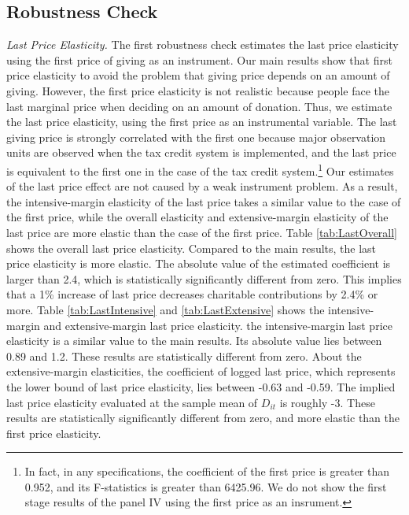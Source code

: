 \documentclass[
  11pt,
  a4paper,
]{article}
\begin{document}
\hypertarget{robustness-check}{%
\subsection{Robustness Check}\label{robustness-check}}

\emph{Last Price Elasticity.}
The first robustness check estimates the last price elasticity using the first price of giving as an instrument.
Our main results show that first price elasticity to avoid the problem that giving price depends on an amount of giving.
However, the first price elasticity is not realistic because people face the last marginal price when deciding on an amount of donation.
Thus, we estimate the last price elasticity, using the first price as an instrumental variable.
The last giving price is strongly correlated with the first one because
major observation units are observed when the tax credit system is implemented,
and the last price is equivalent to the first one in the case of the tax credit system.\footnote{In fact, in any specifications, the coefficient of the first price is greater than 0.952, and its F-statistics is greater than 6425.96. We do not show the first stage results of the panel IV using the first price as an insrument.}
Our estimates of the last price effect are not caused by a weak instrument problem.
As a result, the intensive-margin elasticity of the last price takes a similar value to the case of the first price, while
the overall elasticity and extensive-margin elasticity of the last price are more elastic than the case of the first price.
Table \ref{tab:LastOverall} shows the overall last price elasticity.
Compared to the main results, the last price elasticity is more elastic.
The absolute value of the estimated coefficient is larger than 2.4,
which is statistically significantly different from zero.
This implies that a 1\% increase of last price decreases charitable contributions by 2.4\% or more.
Table \ref{tab:LastIntensive} and \ref{tab:LastExtensive} shows
the intensive-margin and extensive-margin last price elasticity.
the intensive-margin last price elasticity is a similar value to the main results.
Its absolute value lies between 0.89 and 1.2.
These results are statistically different from zero.
About the extensive-margin elasticities,
the coefficient of logged last price, which represents the lower bound of last price elasticity,
lies between -0.63 and -0.59.
The implied last price elasticity evaluated at the sample mean of \(D_{it}\) is roughly -3.
These results are statistically significantly different from zero, and more elastic than the first price elasticity.
\end{document}
